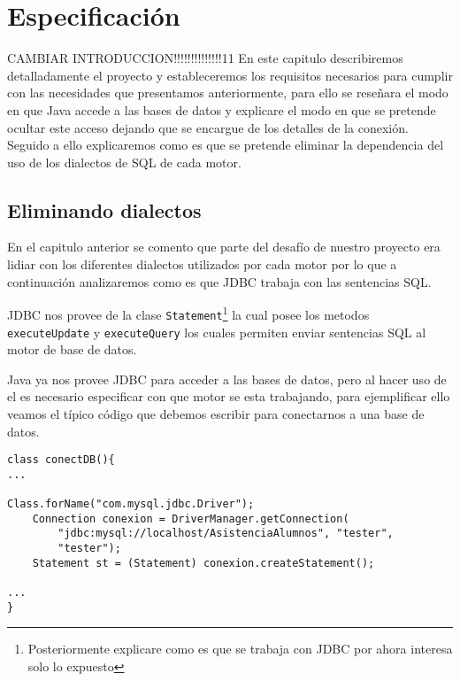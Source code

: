 \chapter{Especificación}\label{capitulo:especificacion}
CAMBIAR INTRODUCCION!!!!!!!!!!!!!!11
En este capitulo describiremos detalladamente el proyecto y estableceremos los requisitos necesarios para cumplir con las necesidades que presentamos anteriormente, para ello se reseñara el modo en que Java accede a las bases de datos y explicare el modo en que se pretende ocultar este acceso dejando que \jj se encargue de los detalles de la conexión. Seguido a ello explicaremos como es que se pretende eliminar la dependencia del uso de los dialectos de SQL de cada motor.



\section{Eliminando dialectos}
En el capitulo anterior se comento que parte del desafío de nuestro proyecto era lidiar con los diferentes  dialectos utilizados por cada motor por lo que a continuación analizaremos como es que JDBC trabaja con las sentencias SQL.

JDBC nos provee de la clase \verb=Statement=\footnote{Posteriormente explicare como es que se trabaja con JDBC por ahora interesa solo lo expuesto} la cual posee los metodos \verb=executeUpdate= y \verb=executeQuery= los cuales permiten enviar sentencias SQL al motor de base de datos.

Java ya nos provee JDBC para acceder a las bases de datos, pero al hacer uso de el es necesario especificar con que motor se esta trabajando, para ejemplificar ello veamos el típico código que debemos escribir para conectarnos a una base de datos.

\begin{lstlisting}[title=Porción de codigo java para la conexión a una base de datos]
class conectDB(){
...

Class.forName("com.mysql.jdbc.Driver");
	Connection conexion = DriverManager.getConnection(
		"jdbc:mysql://localhost/AsistenciaAlumnos", "tester",
		"tester");
	Statement st = (Statement) conexion.createStatement();

...
}
\end{lstlisting}

